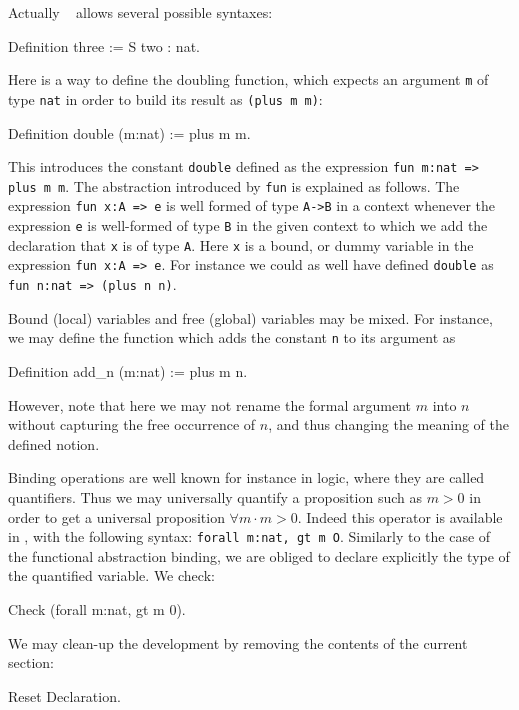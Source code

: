 \documentclass[11pt,a4paper]{book}
\begin{document}
Actually \Coq~ allows several possible syntaxes:
\begin{coq_example}
Definition three := S two : nat.
\end{coq_example}

Here is a way to define the doubling function, which expects an
argument \verb:m: of type \verb:nat: in order to build its result as
\verb:(plus m m)::

\begin{coq_example}
Definition double (m:nat) := plus m m.
\end{coq_example}
This introduces the constant \texttt{double} defined as the
expression \texttt{fun m:nat => plus m m}.
The abstraction introduced by \texttt{fun} is explained as follows. The expression
\verb+fun x:A => e+ is well formed of type \verb+A->B+ in a context
whenever the expression \verb+e+ is well-formed of type \verb+B+ in 
the given context to which we add the declaration that \verb+x+
is of type \verb+A+. Here \verb+x+ is a bound, or dummy variable in
the expression \verb+fun x:A => e+. For instance we could as well have
defined \verb:double: as \verb+fun n:nat => (plus n n)+.

Bound (local) variables and free (global) variables may be mixed.
For instance, we may define the function which adds the constant \verb:n:
to its argument as
\begin{coq_example}
Definition add_n (m:nat) := plus m n.
\end{coq_example}
However, note that here we may not rename the formal argument $m$ into $n$
without capturing the free occurrence of $n$, and thus changing the meaning
of the defined notion.

Binding operations are well known for instance in logic, where they
are called quantifiers.  Thus we may universally quantify a
proposition such as $m>0$ in order to get a universal proposition
$\forall m\cdot m>0$. Indeed this operator is available in \Coq, with
the following syntax: \verb+forall m:nat, gt m O+. Similarly to the
case of the functional abstraction binding, we are obliged to declare
explicitly the type of the quantified variable. We check:
\begin{coq_example}
Check (forall m:nat, gt m 0).
\end{coq_example}
We may clean-up the development by removing the contents of the
current section:
\begin{coq_example}
Reset Declaration.
\end{coq_example}
\end{document}
